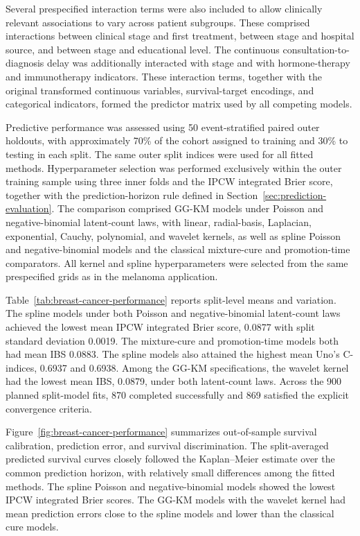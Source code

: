 Several prespecified interaction terms were also included to allow clinically
relevant associations to vary across patient subgroups. These comprised
interactions between clinical stage and first treatment, between stage and
hospital source, and between stage and educational level. The continuous
consultation-to-diagnosis delay was additionally interacted with stage and
with hormone-therapy and immunotherapy indicators. These interaction terms,
together with the original transformed continuous variables, survival-target
encodings, and categorical indicators, formed the predictor matrix used by
all competing models.

Predictive performance was assessed using 50 event-stratified paired outer
holdouts, with approximately 70\% of the cohort assigned to training and
30\% to testing in each split. The same outer split indices were used for
all fitted methods. Hyperparameter selection was performed exclusively
within the outer training sample using three inner folds and the IPCW
integrated Brier score, together with the prediction-horizon rule defined
in Section~\ref{sec:prediction-evaluation}. The comparison comprised GG-KM
models under Poisson and negative-binomial latent-count laws, with linear,
radial-basis, Laplacian, exponential, Cauchy, polynomial, and
wavelet kernels, as well as spline Poisson and negative-binomial
models and the classical mixture-cure and promotion-time comparators.
All kernel and spline hyperparameters were selected from the same
prespecified grids as in the melanoma application.


Table~\ref{tab:breast-cancer-performance} reports split-level means and
variation. The spline models under both Poisson and negative-binomial
latent-count laws achieved the lowest mean IPCW integrated Brier score,
0.0877 with split standard deviation 0.0019. The mixture-cure
and promotion-time models both had mean IBS 0.0883. The spline models
also attained the highest mean Uno's C-indices, 0.6937 and 0.6938. Among the
GG-KM specifications, the wavelet kernel had the lowest mean IBS, 0.0879,
under both latent-count laws. Across the 900 planned
split-model fits, 870 completed successfully and 869 satisfied the explicit
convergence criteria.

Figure~\ref{fig:breast-cancer-performance} summarizes out-of-sample survival
calibration, prediction error, and survival discrimination. The split-averaged
predicted survival curves closely followed the Kaplan--Meier estimate over
the common prediction horizon, with relatively small differences among the
fitted methods. The spline Poisson and negative-binomial models showed the
lowest IPCW integrated Brier scores. The GG-KM models with the
wavelet kernel had mean prediction errors close to the spline models and
lower than the classical cure models.

